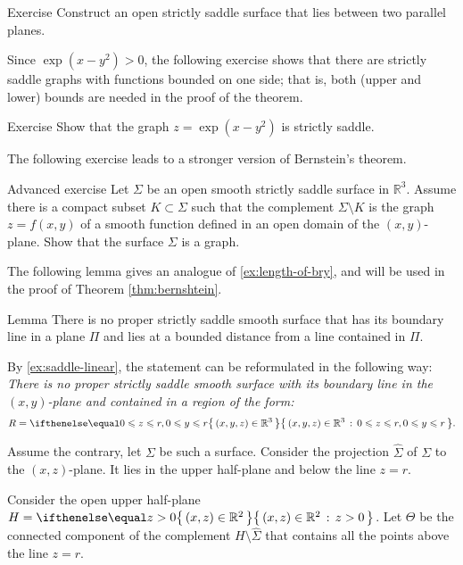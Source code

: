 \begin{thm}{Exercise}\label{ex:between-parallels}
Construct an open strictly saddle surface that lies between two parallel planes.
\end{thm}

Since $\exp(x-y^2)>0$,
the following exercise shows that there are strictly saddle graphs with functions bounded on one side;
that is, both (upper and lower) bounds are needed in the proof of the theorem.

\begin{thm}{Exercise}\label{ex:one-side-bernshtein}
Show that the graph
$z=\exp(x-y^2)$
is strictly saddle.
\end{thm}

The following exercise leads to a stronger version of Bernstein's theorem.

\begin{thm}{Advanced exercise}\label{ex:saddle-graph}
Let $\Sigma$ be an open smooth strictly saddle surface in $\mathbb{R}^3$.
Assume there is a compact subset $K\subset \Sigma$ such that the complement $\Sigma\setminus K$ is the graph $z=f(x,y)$ of a smooth function defined in an open domain of the $(x,y)$-plane.
Show that the surface $\Sigma$ is a graph.
\end{thm}

The following lemma gives an analogue of \ref{ex:length-of-bry}, and will be used in the proof of Theorem \ref{thm:bernshtein}.

\begin{thm}{Lemma}\label{lem:region}
There is no proper strictly saddle smooth surface that has its boundary line in a plane $\Pi$ and lies at a bounded distance from a line contained in $\Pi$.
\end{thm}

By \ref{ex:saddle-linear}, the statement can be reformulated in the following way:
\textit{There is no proper strictly saddle smooth surface 
with its boundary line in the $(x,y)$-plane
and contained in a region of the form:}
\[R=\set{(x,y,z)\in\mathbb{R}^3}{0\le z\le r, 0\le y\le r}.\]

Assume the contrary, let $\Sigma$ be such a surface.
Consider the projection $\hat \Sigma$ of $\Sigma$ to the $(x,z)$-plane.
It lies in the upper half-plane and below the line $z=r$.

Consider the open upper half-plane $H=\set{(x,z)\in \mathbb{R}^2}{z> 0}$.
Let $\Theta$ be the connected component of the complement $H\setminus \hat \Sigma$ that contains all the points above the line $z=r$.

